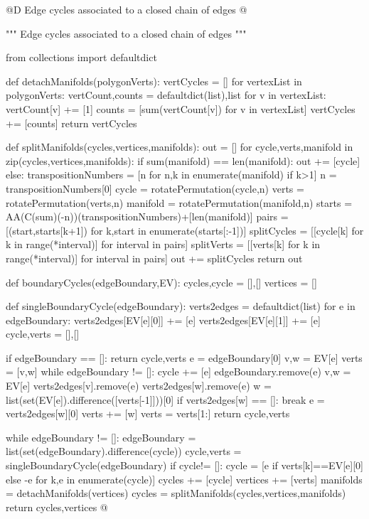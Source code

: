 \documentclass[11pt,oneside]{article}	%
\begin{document}
@D Edge cycles associated to a closed chain of edges
@{""" Edge cycles associated to a closed chain of edges """

from collections import defaultdict

def detachManifolds(polygonVerts):
    vertCycles = []
    for vertexList in polygonVerts:
        vertCount,counts = defaultdict(list),list
        for v in vertexList: 
            vertCount[v] += [1]
        counts = [sum(vertCount[v]) for v in vertexList]
        vertCycles += [counts]
    return vertCycles
    
def splitManifolds(cycles,vertices,manifolds):
    out = []
    for cycle,verts,manifold in zip(cycles,vertices,manifolds):
        if sum(manifold) == len(manifold):
            out += [cycle] 
        else:
            transpositionNumbers = [n for n,k in enumerate(manifold) if k>1]
            n = transpositionNumbers[0]
            cycle = rotatePermutation(cycle,n) 
            verts = rotatePermutation(verts,n) 
            manifold = rotatePermutation(manifold,n) 
            starts = AA(C(sum)(-n))(transpositionNumbers)+[len(manifold)]
            pairs = [(start,starts[k+1]) for k,start in enumerate(starts[:-1])]
            splitCycles = [[cycle[k] for k in range(*interval)] for interval in pairs]
            splitVerts = [[verts[k] for k in range(*interval)] for interval in pairs]
            out += splitCycles
    return out

def boundaryCycles(edgeBoundary,EV):
    cycles,cycle = [],[]
    vertices = []
    
    def singleBoundaryCycle(edgeBoundary):
        verts2edges = defaultdict(list)
        for e in edgeBoundary:
            verts2edges[EV[e][0]] += [e]
            verts2edges[EV[e][1]] += [e]
        cycle,verts = [],[]
        
        if edgeBoundary == []: return cycle,verts
        e = edgeBoundary[0]
        v,w = EV[e]
        verts = [v,w]
        while edgeBoundary != []:
            cycle += [e]
            edgeBoundary.remove(e)
            v,w = EV[e]
            verts2edges[v].remove(e)
            verts2edges[w].remove(e)
            w = list(set(EV[e]).difference([verts[-1]]))[0]
            if verts2edges[w] == []: break
            e = verts2edges[w][0]
            verts += [w]
        verts = verts[1:]
        return cycle,verts
        
    while edgeBoundary != []:
        edgeBoundary = list(set(edgeBoundary).difference(cycle))
        cycle,verts = singleBoundaryCycle(edgeBoundary)
        if cycle!= []: 
            cycle = [e if verts[k]==EV[e][0] else -e for k,e in enumerate(cycle)]
            cycles += [cycle]
            vertices += [verts]
    manifolds = detachManifolds(vertices)
    cycles = splitManifolds(cycles,vertices,manifolds)
    return cycles,vertices
@}
\end{document}
